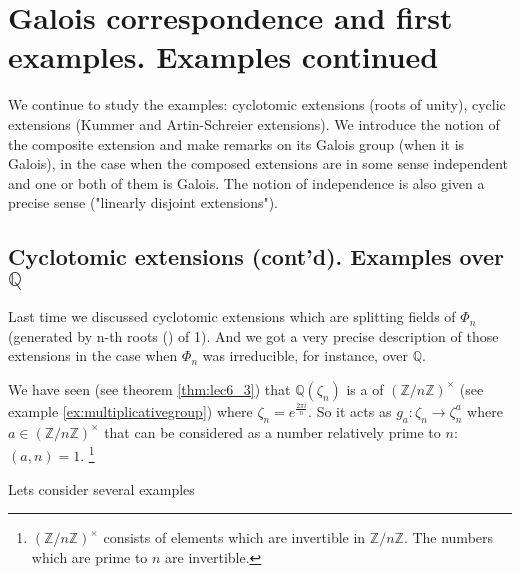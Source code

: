\chapter{Galois correspondence and first examples. Examples continued}
We continue to study the examples: cyclotomic extensions (roots of
unity), cyclic extensions (Kummer and Artin-Schreier extensions). We
introduce the notion of the composite extension and make remarks on
its Galois group (when it is Galois), in the case when the composed
extensions are in some sense independent and one or both of them is
Galois. The notion of independence is also given a precise sense
("linearly disjoint extensions").


\section{Cyclotomic extensions (cont'd). Examples over $\mathbb{Q}$}

Last time we discussed cyclotomic extensions which are splitting
fields of $\Phi_n$ (generated by n-th roots
() of 1). And we got a very precise
description of those extensions in the case when $\Phi_n$ was
irreducible, for instance, over $\mathbb{Q}$.

We have seen (see theorem \ref{thm:lec6_3}) that
$\mathbb{Q}\left(\zeta_n\right)$ is a  of
 $\left(\mathbb{Z}/n\mathbb{Z}\right)^\times$
(see example \ref{ex:multiplicativegroup}) 
where $\zeta_n = e^{\frac{2 \pi i}{n}}$. So it acts as $g_a: \zeta_n \to
\zeta_n^a$ where $a \in \left(\mathbb{Z}/n\mathbb{Z}\right)^\times$
that can be considered as a number relatively prime to $n$: $\left(a,
n\right) = 1$.
\footnote{
  $\left(\mathbb{Z}/n\mathbb{Z}\right)^\times$ consists of elements
  which are invertible in $\mathbb{Z}/n\mathbb{Z}$. The numbers
  which are prime to $n$ are invertible.
}

Lets consider several examples

